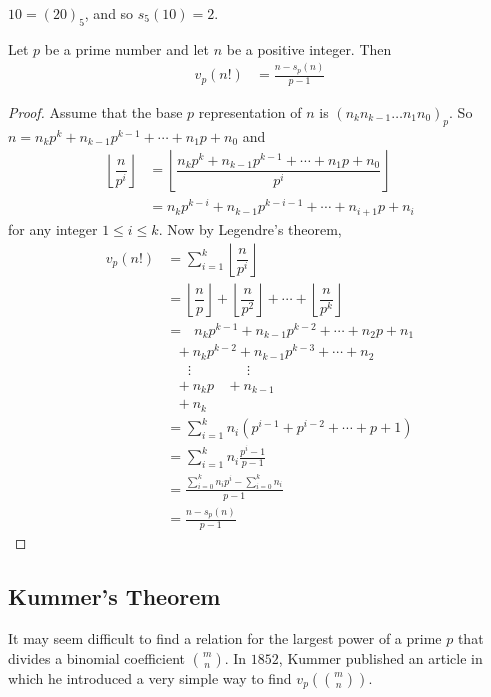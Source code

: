 \documentclass{subfile}
\begin{document}
\begin{example}
	$10=(20)_5$, and so $s_5(10)=2$.
\end{example}


\begin{theorem}\label{thm:legendrealternative}
	Let $p$ be a prime number and let $n$ be a positive integer. Then
	\begin{align*}
		v_p(n!) & =\frac{n-s_p(n)}{p-1}
	\end{align*}
\end{theorem}

\begin{proof}
	Assume that the base $p$ representation of $n$ is $(n_k n_{k-1}\ldots n_1 n_0)_p$. So $n=n_kp^k + n_{k-1}p^{k-1} + \cdots + n_1 p +n_0$ and
	\begin{align*}
		\left\lfloor\dfrac{n}{p^i}\right\rfloor
		&=	\left\lfloor\dfrac{n_kp^k + n_{k-1}p^{k-1} + \cdots + n_1 p +n_0}{p^i}\right\rfloor \\
		&= n_kp^{k-i} + n_{k-1}p^{k-i-1} + \cdots + n_{i+1} p + n_i
	\end{align*}
	for any integer $1 \leq i \leq k$. Now by Legendre's theorem,
	\begin{align*}
		v_p(n!) & = \sum_{i=1}^{k}\left\lfloor\dfrac{n}{p^i}\right\rfloor\\
		&= \left\lfloor\dfrac{n}{p}\right\rfloor+\left\lfloor\dfrac{n}{p^2}\right\rfloor+\cdots+\left\lfloor\dfrac{n}{p^k}\right\rfloor\\
		&= \ \ \ n_kp^{k-1} + n_{k-1}p^{k-2} + \cdots + n_{2} p + n_1 \\  &\ \ \ + n_kp^{k-2} + n_{k-1}p^{k-3} + \cdots + n_{2}\\ &\ \ \ \ \ \ \ \vdots \qquad\qquad \vdots\\  &\ \ \ + n_kp  \ \ \ \ + n_{k-1} \\&\ \ \ + n_k\\
		&=\sum_{i=1}^k n_i(p^{i-1}+p^{i-2}+\cdots+p+1)\\
		&= \sum_{i=1}^k n_i\frac{p^i-1}{p-1}\\
		&=\displaystyle \frac{\displaystyle \sum\limits_{i=0}^k n_i p^i - \sum\limits_{i=0}^k n_i}{p-1}\\
		&=\frac{n-s_p(n)}{p-1}
	\end{align*}
\end{proof}

\subsection{Kummer's Theorem}
It may seem difficult to find a relation for the largest power of a prime $p$ that divides a binomial coefficient $\binom{m}{n}$. In $1852$, Kummer published an article in which he introduced a very simple way to find $v_p\left(\binom{m}{n}\right)$.
\end{document}
